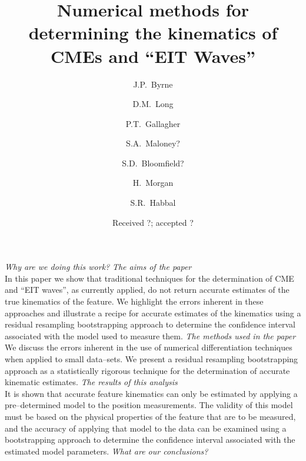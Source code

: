 \documentclass[structabstract]{aa}
\begin{document}
\title{Numerical methods for determining the kinematics of CMEs and ``EIT Waves''}

\author{J.P.~Byrne
	\and D.M.~Long
	\and P.T.~Gallagher
	\and S.A.~Maloney?
	\and S.D.~Bloomfield?
	\and H.~Morgan
	\and S.R.~Habbal}

\date{Received ?; accepted ?}
\abstract
{\emph{Why are we doing this work?} }
{\emph{The aims of the paper} \\
In this paper we show that traditional techniques for the determination of CME and ``EIT waves'', as currently applied, do not return accurate estimates of the true kinematics of the feature. We highlight the errors inherent in these approaches and illustrate a recipe for accurate estimates of the kinematics using a residual resampling bootstrapping approach to determine the confidence interval associated with the model used to measure them.}
{\emph{The methods used in the paper} \\
We discuss the errors inherent in the use of numerical differentiation techniques when applied to small data--sets. We present a residual resampling bootstrapping approach as a statistically rigorous technique for the determination of accurate kinematic estimates.}
{\emph{The results of this analysis} \\
It is shown that accurate feature kinematics can only be estimated by applying a pre--determined model to the position measurements. The validity of this model must be based on the physical properties of the feature that are to be measured, and the accuracy of applying that model to the data can be examined using a bootstrapping approach to determine the confidence interval associated with the estimated model parameters.}
{\emph{What are our conclusions?}}


\end{document}
